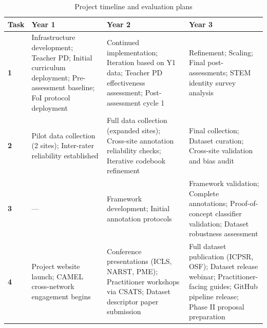 \documentclass[11pt]{article}
\begin{document}
\begin{table}[h]
\footnotesize
    \centering
    \caption{Project timeline and evaluation plans}
    \vspace{-0.25cm}
    \begin{tabular}{|p{0.6cm}|p{4.5cm}|p{4.5cm}|p{5cm}|}
    \hline
    \rowcolor{mycmykcolor}
         \textbf{Task} & \textbf{Year 1} & \textbf{Year 2} & \textbf{Year 3} \\
         \hline
         \textbf{1} & Infrastructure development; Teacher PD; Initial curriculum deployment; Pre-assessment baseline; FoI protocol deployment & Continued implementation; Iteration based on Y1 data; Teacher PD effectiveness assessment; Post-assessment cycle 1 & Refinement; Scaling; Final post-assessments; STEM identity survey analysis \\
         \hline
         \textbf{2} & Pilot data collection (2 sites); Inter-rater reliability established & Full data collection (expanded sites); Cross-site annotation reliability checks; Iterative codebook refinement & Final collection; Dataset curation; Cross-site validation and bias audit \\
         \hline
         \textbf{3} & — & Framework development; Initial annotation protocols & Framework validation; Complete annotations; Proof-of-concept classifier validation; Dataset robustness assessment \\
         \hline
         \textbf{4} & Project website launch; CAMEL cross-network engagement begins & Conference presentations (ICLS, NARST, PME); Practitioner workshops via CSATS; Dataset descriptor paper submission & Full dataset publication (ICPSR, OSF); Dataset release webinar; Practitioner-facing guides; GitHub pipeline release; Phase II proposal preparation \\
         \hline
    \end{tabular}
    \label{tab:timeline}
\end{table}

\newpage
 
\end{document}
